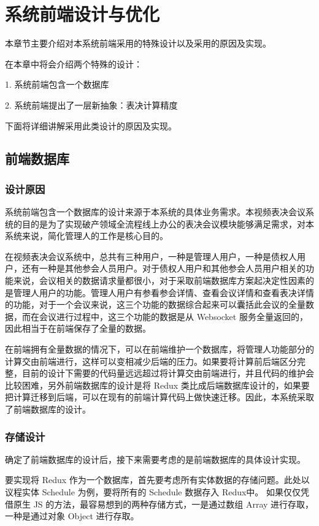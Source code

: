\chapter{系统前端设计与优化}
本章节主要介绍对本系统前端采用的特殊设计以及采用的原因及实现。

在本章中将会介绍两个特殊的设计：

1. 系统前端包含一个数据库

2. 系统前端提出了一层新抽象：表决计算精度

下面将详细讲解采用此类设计的原因及实现。

\section{前端数据库}

\subsection{设计原因}

系统前端包含一个数据库的设计来源于本系统的具体业务需求。本视频表决会议系统的目的是为了实现破产领域全流程线上办公的表决会议模块能够满足需求，对本系统来说，简化管理人的工作是核心目的。

在视频表决会议系统中，总共有三种用户，一种是管理人用户，一种是债权人用户，还有一种是其他参会人员用户。对于债权人用户和其他参会人员用户相关的功能来说，会议相关的数据请求量都很小，对于采取前端数据库方案起决定性因素的是管理人用户的功能。管理人用户有参看参会详情、查看会议详情和查看表决详情的功能，对于一个会议来说，这三个功能的数据综合起来可以囊括此会议的全量数据，而在会议进行过程中，这三个功能的数据是从 Websocket 服务全量返回的，因此相当于在前端保存了全量的数据。

在前端拥有全量数据的情况下，可以在前端维护一个数据库，将管理人功能部分的计算交由前端进行，这样可以变相减少后端的压力。如果要将计算前后端区分完整，目前的设计下需要的代码量远远超过将计算交由前端进行，并且代码的维护会比较困难，另外前端数据库的设计是将 Redux 类比成后端数据库设计的，如果要把计算迁移到后端，可以在现有的前端计算代码上做快速迁移。因此，本系统采取了前端数据库的设计。

\subsection{存储设计}

确定了前端数据库的设计后，接下来需要考虑的是前端数据库的具体设计实现。

要实现将 Redux 作为一个数据库，首先要考虑所有实体数据的存储问题。此处以议程实体 Schedule 为例，要将所有的 Schedule 数据存入 Redux中。 如果仅仅凭借原生 JS 的方法，最容易想到的两种存储方式，一是通过数组 Array 进行存取，一种是通过对象 Object 进行存取。

